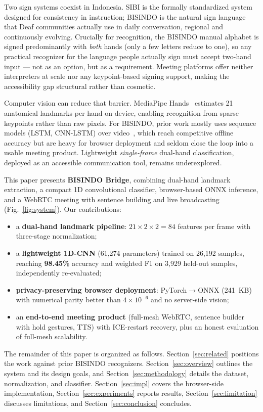 \documentclass{llncs}
\newcommand{\kw}[1]{\textbf{#1}}
\begin{document}
Two sign systems coexist in Indonesia. SIBI is the formally standardized
system designed for consistency in instruction; BISINDO is the natural
sign language that Deaf communities actually use in daily conversation,
regional and continuously evolving. Crucially for recognition, the
BISINDO manual alphabet is signed predominantly with \emph{both} hands
(only a few letters reduce to one), so any practical recognizer for the
language people actually sign must accept two-hand input --- not as an
option, but as a requirement. Meeting platforms offer neither
interpreters at scale nor any keypoint-based signing support, making the
accessibility gap structural rather than cosmetic.

Computer vision can reduce that barrier. MediaPipe
Hands~\cite{mediapipehands2020} estimates 21 anatomical landmarks per
hand on-device, enabling recognition from sparse keypoints rather than
raw pixels. For BISINDO, prior work mostly uses sequence models
(LSTM, CNN-LSTM) over video~\cite{auziqni2022,bisindo-lstm-2023,cnn-lstm-bp},
which reach competitive offline accuracy but are heavy for browser
deployment and seldom close the loop into a usable meeting product.
Lightweight \emph{single-frame} dual-hand classification, deployed as an
accessible communication tool, remains underexplored.

This paper presents \kw{BISINDO Bridge}, combining dual-hand landmark
extraction, a compact 1D convolutional classifier, browser-based ONNX
inference, and a WebRTC meeting with sentence building and live
broadcasting (Fig.~\ref{fig:system}). Our contributions:
\begin{itemize}
\item a \kw{dual-hand landmark pipeline}: $21 \times 2 \times 2 = 84$
features per frame with three-stage normalization;
\item a \kw{lightweight 1D-CNN} (61{,}274 parameters) trained on
26{,}192 samples, reaching \textbf{98.45\%} accuracy and weighted F1 on
3{,}929 held-out samples, independently re-evaluated;
\item \kw{privacy-preserving browser deployment}: PyTorch$\to$ONNX
(241~KB) with numerical parity better than $4\times10^{-6}$ and no
server-side vision;
\item an \kw{end-to-end meeting product} (full-mesh WebRTC, sentence
builder with hold gestures, TTS) with ICE-restart recovery, plus an
honest evaluation of full-mesh scalability.
\end{itemize}

The remainder of this paper is organized as follows.
Section~\ref{sec:related} positions the work against prior BISINDO
recognizers. Section~\ref{sec:overview} outlines the system and its
design goals, and Section~\ref{sec:methodology} details the dataset,
normalization, and classifier. Section~\ref{sec:impl} covers the
browser-side implementation, Section~\ref{sec:experiments} reports
results, Section~\ref{sec:limitation} discusses limitations, and
Section~\ref{sec:conclusion} concludes.
\end{document}
